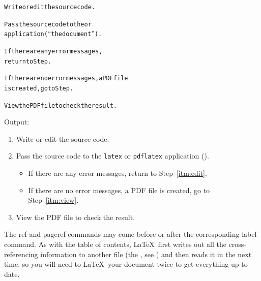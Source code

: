 \begin{code}[0.9\linewidth]
\begin{alltt}

    Write or edit the source code.

    Pass the source code to the  or  
        application (``the document'').


          If there are any error messages, 
               return to Step.

          If there are no error messages, a PDF file
               is created, go to Step.

    View the PDF file to check the result.

\end{alltt}
\end{code}
Output:
\begin{result}
\begin{enumerate}

   \item\label{itm:edit} Write or edit the source code.

   \item Pass the source code to the \texttt{latex} or \texttt{pdflatex} application 
        ().

      \begin{itemize}

         \item If there are any error messages, 
               return to Step~\ref*{itm:edit}.

         \item If there are no error messages, a PDF file
               is created, go to Step~\ref*{itm:view}.
      \end{itemize}

   \item\label{itm:view} View the PDF file to check the result.

\end{enumerate}
\end{result}

The \gls{ref} and \gls{pageref} commands may come before or
after the corresponding \gls{label} command.  As with the table
of contents, \LaTeX\ first writes out all the cross-referencing
information to another file (the \iauxfile, see ) and then reads it in the
next time, so you will need to \LaTeX\ your document twice to get
everything up-to-date.

